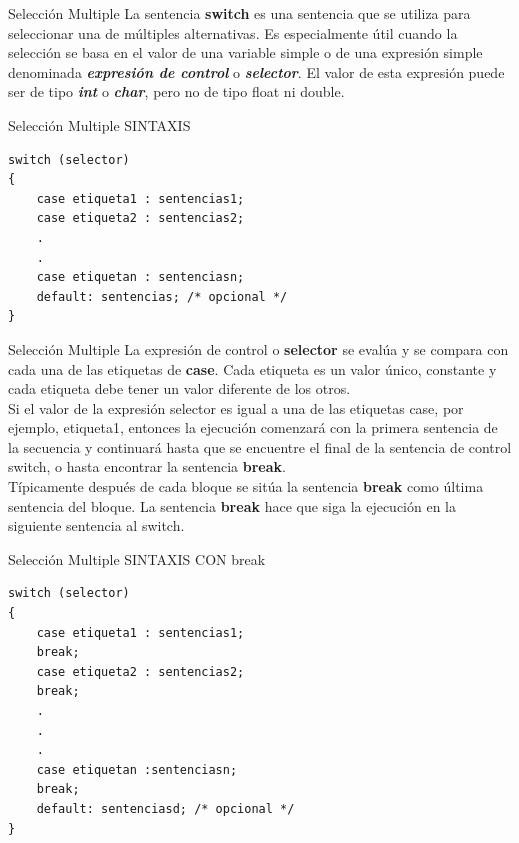 \begin{frame}[c]{Selección Multiple}
La sentencia \textbf{switch} es una sentencia que se utiliza para seleccionar una de múltiples alternativas. Es especialmente útil cuando la selección se basa en el valor de una variable simple o de una expresión simple denominada \textbf{\textit{expresión de control}} o \textbf{\textit{selector}}. El valor de esta expresión puede ser de tipo \textit{\textbf{int}} o \textbf{\textit{char}}, pero no de tipo float ni double.
\end{frame}

\begin{frame}[fragile]{Selección Multiple}
\centering
{\LARGE SINTAXIS}
    \begin{lstlisting}
switch (selector)
{
    case etiqueta1 : sentencias1;
    case etiqueta2 : sentencias2;
    .
    .
    case etiquetan : sentenciasn;
    default: sentencias; /* opcional */
}
\end{lstlisting}
\end{frame}


\begin{frame}[t]{Selección Multiple}
\hspace{5mm}La expresión de control o \textbf{selector} se evalúa y se compara con cada una de las etiquetas de \textbf{case}. Cada etiqueta es un valor único, constante y cada etiqueta debe tener un valor diferente de los otros.\\
\hspace{5mm}Si el valor de la expresión selector es igual a una de las etiquetas case, por ejemplo, etiqueta1, entonces
la ejecución comenzará con la primera sentencia de la secuencia y continuará hasta que se encuentre el final de la sentencia de control switch, o hasta encontrar la sentencia \textbf{break}.\\
\hspace{5mm}Típicamente después de cada bloque se sitúa la sentencia \textbf{break }como última sentencia del bloque. La sentencia \textbf{break} hace que siga la ejecución en la siguiente sentencia al switch.
\end{frame}

\begin{frame}[c,fragile]{Selección Multiple}
\centering
SINTAXIS CON break
\begin{lstlisting}
switch (selector)
{
    case etiqueta1 : sentencias1;
    break;
    case etiqueta2 : sentencias2;
    break;
    .
    .
    .
    case etiquetan :sentenciasn;
    break;
    default: sentenciasd; /* opcional */
}
\end{lstlisting}
\end{frame}

